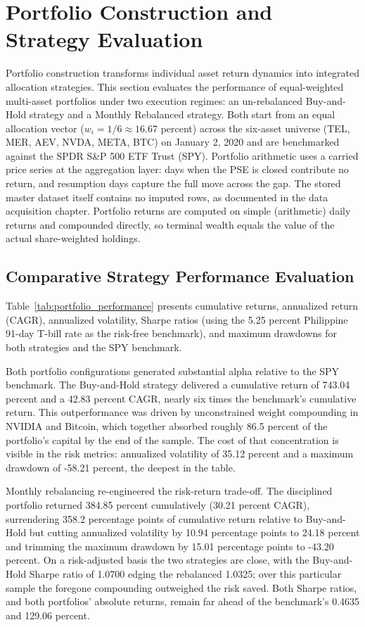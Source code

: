 \section{Portfolio Construction and Strategy Evaluation}

Portfolio construction transforms individual asset return dynamics into integrated allocation strategies. This section evaluates the performance of equal-weighted multi-asset portfolios under two execution regimes: an un-rebalanced Buy-and-Hold strategy and a Monthly Rebalanced strategy. Both start from an equal allocation vector ($w_i = 1/6 \approx 16.67$ percent) across the six-asset universe (TEL, MER, AEV, NVDA, META, BTC) on January 2, 2020 and are benchmarked against the SPDR S\&P 500 ETF Trust (SPY). Portfolio arithmetic uses a carried price series at the aggregation layer: days when the PSE is closed contribute no return, and resumption days capture the full move across the gap. The stored master dataset itself contains no imputed rows, as documented in the data acquisition chapter. Portfolio returns are computed on simple (arithmetic) daily returns and compounded directly, so terminal wealth equals the value of the actual share-weighted holdings.

\subsection{Comparative Strategy Performance Evaluation}

Table~\ref{tab:portfolio_performance} presents cumulative returns, annualized return (CAGR), annualized volatility, Sharpe ratios (using the 5.25 percent Philippine 91-day T-bill rate as the risk-free benchmark), and maximum drawdowns for both strategies and the SPY benchmark.



Both portfolio configurations generated substantial alpha relative to the SPY benchmark. The Buy-and-Hold strategy delivered a cumulative return of 743.04 percent and a 42.83 percent CAGR, nearly six times the benchmark's cumulative return. This outperformance was driven by unconstrained weight compounding in NVIDIA and Bitcoin, which together absorbed roughly 86.5 percent of the portfolio's capital by the end of the sample. The cost of that concentration is visible in the risk metrics: annualized volatility of 35.12 percent and a maximum drawdown of -58.21 percent, the deepest in the table.

Monthly rebalancing re-engineered the risk-return trade-off. The disciplined portfolio returned 384.85 percent cumulatively (30.21 percent CAGR), surrendering 358.2 percentage points of cumulative return relative to Buy-and-Hold but cutting annualized volatility by 10.94 percentage points to 24.18 percent and trimming the maximum drawdown by 15.01 percentage points to -43.20 percent. On a risk-adjusted basis the two strategies are close, with the Buy-and-Hold Sharpe ratio of 1.0700 edging the rebalanced 1.0325; over this particular sample the foregone compounding outweighed the risk saved. Both Sharpe ratios, and both portfolios' absolute returns, remain far ahead of the benchmark's 0.4635 and 129.06 percent.


